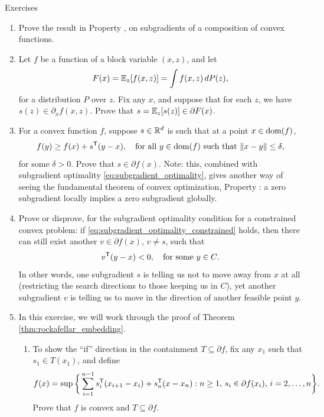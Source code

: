 \begin{xcb}{Exercises}
\begin{enumerate}[label=\thechapter.\arabic*]
\item Prove the result in Property , on
  subgradients of a composition of convex functions.   

\item Let $f$ be a function of a block variable $(x,z)$, and let 
  \[
  F(x) = \mathbb{E}_z[ f(x,z) ] = \int f(x,z) \, dP(z),
  \]
  for a distribution $P$ over $z$. Fix any $x$, and suppose that for each $z$,
  we have $s(z) \in \partial_x f(x,z)$. Prove that $s = \mathbb{E}_z[s(z)] \in \partial
  F(x)$.  

\item For a convex function $f$, suppose $s \in \mathbb{R}^d$ is such that at a point $x
  \in \operatorname{dom}(f)$,
  \[
  f(y) \geq f(x) + s^{\mathsf{T}} (y-x), \quad \text{for all $y \in \operatorname{dom}(f)$ such that
    $\|x - y\| \leq \delta$},
  \]
  for some $\delta>0$. Prove that $s \in \partial f(x)$. Note: this, combined
  with subgradient optimality \eqref{eq:subgradient_optimality}, gives another 
  way of seeing the fundamental theorem of convex optimization, Property
  : a zero subgradient locally implies a zero
  subgradient globally.   

\item Prove or disprove, for the subgradient optimality condition for a
  constrained convex problem: if \eqref{eq:subgradient_optimality_constrained} 
  holds, then there can still exist another $v \in \partial f(x)$, $v \not= s$,
  such that 
  \[
  v^{\mathsf{T}} (y - x) < 0, \quad \text{for some $y \in C$}.
  \]
  In other words, one subgradient $s$ is telling us not to move away from $x$ at
  all (restricting the search directions to those keeping us in $C$), yet
  another subgradient $v$ is telling us to move in the direction of another   
  feasible point $y$.   

\item \label{ex:rockafellar_embedding}
  In this exercise, we will work through the proof of Theorem
  \ref{thm:rockafellar_embedding}. 

\begin{enumerate}[label=\alph*.]
\item To show the ``if'' direction in the containment $T \subseteq \partial f$,
  fix any $x_1$ such that $s_1 \in T(x_1)$, and define 
  \[
  f(x) = \sup\bigg\{ \sum_{i=1}^{n-1} s_i^{\mathsf{T}} (x_{i+1} - x_i) + s_n^{\mathsf{T}} (x - x_n)
  : \text{$n \geq 1$, $s_i \in \partial f(x_i)$, $i=2,\ldots,n$} \bigg\}.
  \]
  Prove that $f$ is convex and $T \subseteq \partial f$.


\end{enumerate}
\end{enumerate}
\end{xcb}
